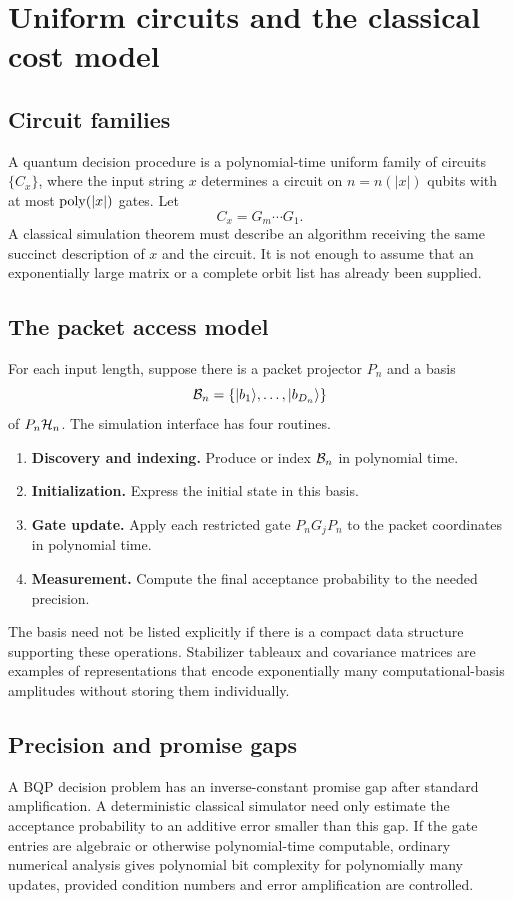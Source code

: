 \chapter{Uniform circuits and the classical cost model}
\label{ch:complexity-model}

\section{Circuit families}
A quantum decision procedure is a polynomial-time uniform family of circuits $\{C_x\}$, where the input string $x$ determines a circuit on $n=n(|x|)$ qubits with at most $\operatorname{poly}(|x|)$ gates. Let
\[
C_x=G_m\cdots G_1.
\]
A classical simulation theorem must describe an algorithm receiving the same succinct description of $x$ and the circuit. It is not enough to assume that an exponentially large matrix or a complete orbit list has already been supplied.

\section{The packet access model}
For each input length, suppose there is a packet projector $P_n$ and a basis
\[
\mathcal B_n=
\{\lvert b_1\rangle,\ldots,\lvert b_{D_n}\rangle\}
\]
of $P_n\mathcal H_n$. The simulation interface has four routines.

\begin{enumerate}
\item \textbf{Discovery and indexing.} Produce or index $\mathcal B_n$ in polynomial time.
\item \textbf{Initialization.} Express the initial state in this basis.
\item \textbf{Gate update.} Apply each restricted gate $P_nG_jP_n$ to the packet coordinates in polynomial time.
\item \textbf{Measurement.} Compute the final acceptance probability to the needed precision.
\end{enumerate}

The basis need not be listed explicitly if there is a compact data structure supporting these operations. Stabilizer tableaux and covariance matrices are examples of representations that encode exponentially many computational-basis amplitudes without storing them individually.

\section{Precision and promise gaps}
A BQP decision problem has an inverse-constant promise gap after standard amplification. A deterministic classical simulator need only estimate the acceptance probability to an additive error smaller than this gap. If the gate entries are algebraic or otherwise polynomial-time computable, ordinary numerical analysis gives polynomial bit complexity for polynomially many updates, provided condition numbers and error amplification are controlled.


